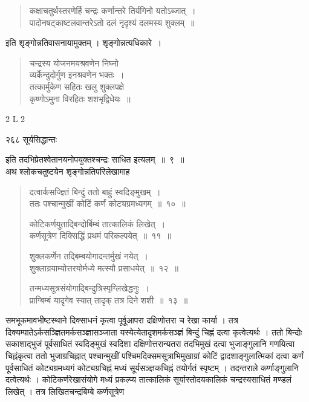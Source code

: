 \documentclass[11pt, openany]{book}
\begin{document}

\begin{quote}
{\qt कक्षाचतुर्थस्तरणेर्हि चन्द्रः कर्णान्तरे तिर्यगिनो यतोऽब्जात्~। \\
पादोनषट्काष्टलवान्तरेऽतो दलं नृदृश्यं दलमस्य शुक्लम्~॥}
\end{quote}
इति शृङ्गोन्नतिवासनायामुक्तम् । शृङ्गोन्नत्यधिकारे~।

\begin{quote}
{\qt चन्द्रस्य योजनमयश्रवणेन निघ्नो \\
व्यर्केन्दुदोर्गुण इनश्रवणेन भक्तः~। \\
तत्कार्मुकेण सहितः खलु शुक्लपक्षे \\
कृष्णोऽमुना विरहितः शशभृद्विधेयः~॥}
\end{quote}

{\tiny{2 L 2}}

\newpage


\noindent २६८ \hspace{4cm} सूर्यसिद्धान्तः
\vspace{1cm}

इति तदभिप्रेतश्वेतानयनोपयुक्तश्चन्द्रः साधित इत्यलम्~॥~९~॥ \\
\noindent अथ श्लोकचतुष्टयेन शृङ्गोन्नतिपरिलेखामाह \textendash

\begin{quote}
{\ssi  दत्वार्कसज्ज्ञ्तिं बिन्दुं ततो बाहुं स्वदिङ्मुखम्~।\\
 ततः पश्चान्मुखीं कोटिं कर्णं कोट्यग्रमध्यगम्~॥~१०~॥

कोटिकर्णयुताद्बिन्दोर्बिम्बं तात्कालिकं लिखेत्~।\\
कर्णसूत्रेण दिक्सिद्धिं प्रथमं परिकल्पयेत्~॥~११~॥

शुक्लकर्णेन तद्बिम्बयोगादन्तर्मुखं नयेत्~।\\
शुक्लाग्रयाम्योत्तरयोर्मध्ये मत्स्यौ प्रसाधयेत्~॥~१२~॥

तन्मध्यसूत्रसंयोगाद्बिन्दुत्रिस्पृग्लिखेद्धनुः~।\\
प्राग्बिम्बं यादृगेव स्यात् तादृक् तत्र दिने शशी~॥~१३~॥ }
\end{quote}

 समभूकमावभीष्टस्थाने दिक्साधनं कृत्वा पूर्वूआपरा दक्षिणोत्तरा च रेखा कार्या । तत्र दिक्यम्पातेऽर्कसञ्ज्ञितमर्कसञ्ज्ञासञ्जाता यस्येत्येतादृशमर्कसञ्ज्ञं बिन्दुं चिह्नं दत्वा कृत्वेत्यर्थः । ततो बिन्दोः सकाशाद्भुजं पूर्वसाधितं स्वदिङ्मुखं स्वदिशा दक्षिणोत्तरान्यतरा तदभिमुखं दत्वा भुजाङ्गुलानि गणयित्वा चिह्नंकृत्वा ततो भुजाग्रचिह्नात् पश्चान्मुखीं पश्चिमदिक्समसूत्राभिमुखाग्रां कोटिं द्वादशाङ्गुलात्मिकां दत्वा कर्णं पूर्वसाधितं कोट्यग्रमध्यगं कोट्यग्रचिह्नं मध्यं सूर्यसञ्ज्ञकचिह्नं तयोर्गतं स्पृष्टम् । तदन्तराले कर्णाङ्गुलानि दत्वेत्यर्थः । कोटिकर्णरेखासंयोगे मध्यं प्रकल्प्य तात्कालिकं सूर्यास्तोदयकालिकं चन्द्रस्यसाधितं मण्डलं लिखेत् । तत्र लिखितचन्द्रबिम्बे कर्णसूत्रेण
\end{document}
